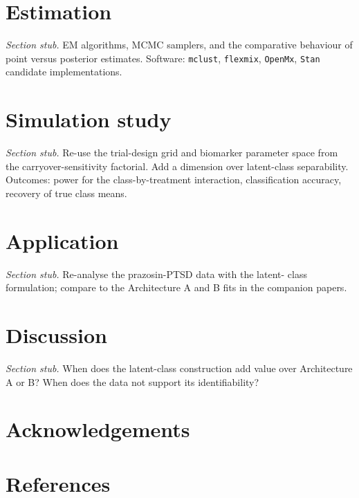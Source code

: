 \documentclass[
]{article}
\begin{document}
\section{Estimation}\label{estimation}

\emph{Section stub.} EM algorithms, MCMC samplers, and the comparative
behaviour of point versus posterior estimates. Software:
\texttt{mclust}, \texttt{flexmix}, \texttt{OpenMx}, \texttt{Stan} candidate implementations.

\section{Simulation study}\label{simulation-study}

\emph{Section stub.} Re-use the trial-design grid and biomarker
parameter space from the carryover-sensitivity factorial. Add a
dimension over latent-class separability. Outcomes: power for the
class-by-treatment interaction, classification accuracy, recovery
of true class means.

\section{Application}\label{application}

\emph{Section stub.} Re-analyse the prazosin-PTSD data with the latent-
class formulation; compare to the Architecture A and B fits in the
companion papers.

\section{Discussion}\label{discussion}

\emph{Section stub.} When does the latent-class construction add value
over Architecture A or B? When does the data not support its
identifiability?

\section{Acknowledgements}\label{acknowledgements}

\section{References}\label{references}
\end{document}
